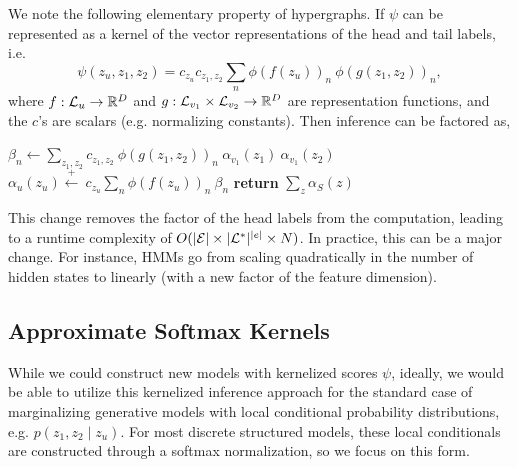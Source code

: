 \documentclass{article}
\begin{document}
We note the following elementary property of hypergraphs. If $\psi$
can be represented as a kernel of the vector representations of the head and tail labels, 
i.e.
\[\psi(z_u, z_1, z_2) =c_{z_u} c_{z_1, z_2} \sum_n \phi(f(z_u))_n \ \phi(g(z_{1}, z_{2}))_n,  \]
where $f : {\cal L}_u \to \mathbb{R}^D $ and $g : {\cal L}_{v_1} \times {\cal L}_{v_2} \to \mathbb{R}^D$ are representation functions, and the $c$'s are scalars (e.g. normalizing constants). Then inference can be factored as, 
\begin{algorithm}
\begin{algorithmic} 
\STATE $\beta_n \gets \displaystyle \sum_{z_1, z_2} c_{z_1, z_2}\  \phi(g(z_{1}, z_{2}))_n \  \alpha_{v_1}(z_1) \  \alpha_{v_1}(z_2)$
\STATE $\alpha_u(z_u) \stackrel{+}{\gets} \displaystyle \  c_{z_u} \sum_n \phi(f(z_u))_n\ \beta_n$
\ENDFOR
\ENDFOR
\STATE \textbf{return} $\sum_z \alpha_S(z)$
\end{algorithmic} 
\end{algorithm}


This change removes the factor of the head labels from the
computation, leading to a runtime complexity of
$O(|{\cal E}|\times |{\cal L}^*|^{|e|}\times N)$.  In practice, this
can be a major change. For instance, HMMs go from scaling quadratically
in the number of hidden states to linearly (with a new factor of the
feature dimension).




\subsection{Approximate Softmax Kernels}

While we could construct new models with kernelized scores $\psi$, ideally, we would be able to utilize this kernelized inference approach for the standard case of marginalizing generative models with local conditional
probability distributions, e.g. $p(z_1, z_2 \mid z_{u})$.  For most discrete structured models, these local conditionals are
constructed through a softmax normalization, so we focus on this form.
\end{document}
